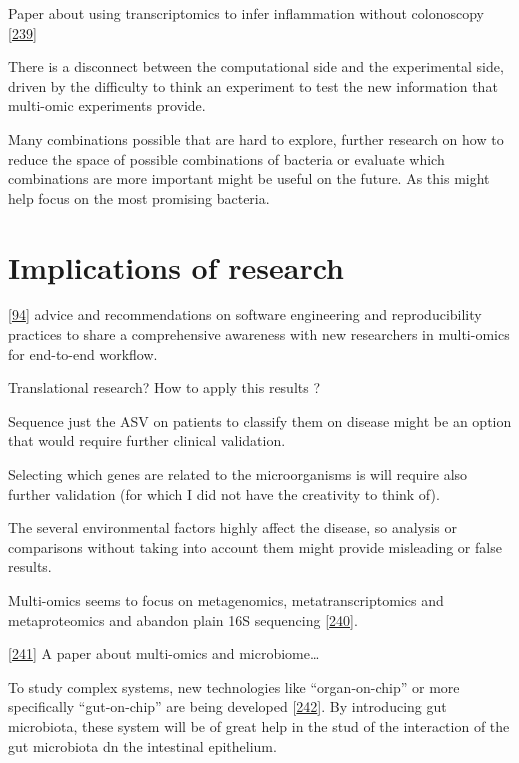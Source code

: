 \documentclass[
  a4paper,
]{book}
\begin{document}
Paper about using transcriptomics to infer inflammation without colonoscopy {[}\protect\hyperlink{ref-ungar2022}{239}{]}

There is a disconnect between the computational side and the experimental side, driven by the difficulty to think an experiment to test the new information that multi-omic experiments provide.

Many combinations possible that are hard to explore, further research on how to reduce the space of possible combinations of bacteria or evaluate which combinations are more important might be useful on the future.
As this might help focus on the most promising bacteria.

\hypertarget{implications-of-research}{%
\section{Implications of research}\label{implications-of-research}}

{[}\protect\hyperlink{ref-krassowski2020}{94}{]} advice and recommendations on software engineering and reproducibility practices to share a comprehensive awareness with new researchers in multi-omics for end-to-end workflow.

Translational research?
How to apply this results ?

Sequence just the ASV on patients to classify them on disease might be an option that would require further clinical validation.

Selecting which genes are related to the microorganisms is will require also further validation (for which I did not have the creativity to think of).

The several environmental factors highly affect the disease, so analysis or comparisons without taking into account them might provide misleading or false results.

Multi-omics seems to focus on metagenomics, metatranscriptomics and metaproteomics and abandon plain 16S sequencing {[}\protect\hyperlink{ref-zhang2019}{240}{]}.

{[}\protect\hyperlink{ref-jiang2019}{241}{]} A paper about multi-omics and microbiome\ldots{}

To study complex systems, new technologies like ``organ-on-chip'' or more specifically ``gut-on-chip'' are being developed {[}\protect\hyperlink{ref-collij2021}{242}{]}.
By introducing gut microbiota, these system will be of great help in the stud of the interaction of the gut microbiota dn the intestinal epithelium.
\end{document}
